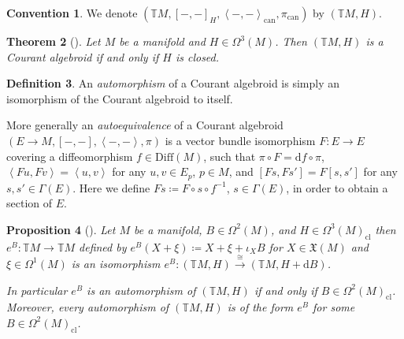\documentclass[12pt,a4paper]{article}
\theoremstyle{plain}
\newtheorem{theorem}{Theorem}[subsection]
\newtheorem{proposition}[theorem]{Proposition}
\theoremstyle{definition}
\newtheorem{definition}[theorem]{Definition}
\newtheorem{convention}[theorem]{Convention}
\newcommand{\scal}[2]{\left\langle #1,#2\right\rangle}
\newcommand{\VFs}{\mathfrak{X}(M)}
\newcommand{\Forms}[1]{\Omega^{#1}(M)}
\newcommand{\ClForms}[1]{\Forms{#1}_{\mathrm{cl}}}
\newcommand{\Diff}{\mathrm{Diff}(M)}
\newcommand{\GenTM}{\mathbb TM}
\renewcommand{\d}{\mathrm{d}}
\begin{document}
\begin{convention}
\label{Conv:ExCAshorthand}
We denote $(\mathbb TM,[-,-]_H,\scal{-}{-}_\mathrm{can},\pi_\mathrm{can})$ by $(\mathbb TM,H)$.
\end{convention}

\begin{theorem}[{\cite[p.~35]{gualtieri}}]
Let $M$ be a manifold and $H\in \Forms{3}$. Then $(\mathbb TM,H)$ is a Courant algebroid if and only if $H$ is closed.
\end{theorem}


\begin{definition}
An \textit{automorphism} of a Courant algebroid is simply an isomorphism of the Courant algebroid to itself.

More generally an \textit{autoequivalence} of a Courant algebroid $(E\to M,[-,-],\scal{-}{-},\pi)$ is a vector bundle isomorphism $F:E\to E$ covering a diffeomorphism $f\in \Diff$, such that $\pi \circ F = \d f \circ \pi$, $\scal{F u}{F v}=\scal{u}{v}$ for any $u,v \in E_p$, $p \in M$, and $[F s,F s']=F [s,s']$ for any $s,s'\in \Gamma(E)$. Here we define $F s\coloneqq F \circ s \circ f^{-1}$, $s\in \Gamma(E)$, in order to obtain a section of $E$.
\end{definition}





\begin{proposition}[{\cite[p.~82]{gualtieriAnn}}]
\label{B-fieldTrafoProp}
Let $M$ be a manifold, $B\in \Forms{2}$, and $H\in \ClForms{3}$ then $e^B:\GenTM\to \GenTM$ defined by $e^B(X+\xi)\coloneqq X+\xi+\iota_XB$ for $X\in \VFs$ and $\xi\in \Forms{1}$ is an isomorphism  $e^B:(\mathbb TM,H)\stackrel{\cong}{\to} (\mathbb TM,H+\d B)$.

In particular $e^B$ is an automorphism of $(\mathbb TM, H)$ if and only if $B\in \ClForms{2}$.
Moreover, every automorphism of $(\mathbb TM, H)$ is of the form $e^B$ for some $B\in \ClForms{2}$.
\end{proposition}
\end{document}

